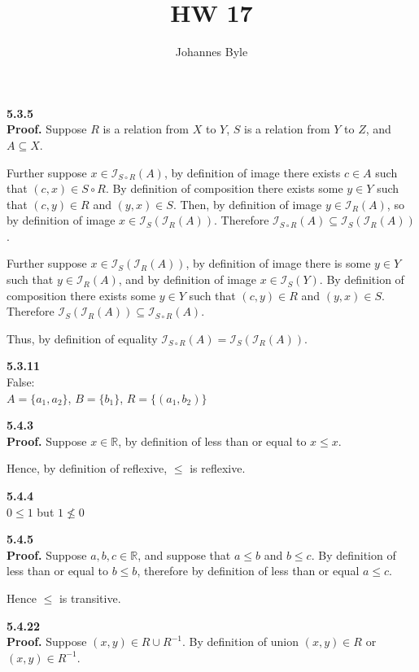 \documentclass[12pt]{article}
\title{HW 17}
\author{Johannes Byle}
\newcommand{\image}[2]{\mathcal{I}_{#1}(#2)}
\begin{document}
    \maketitle
    \noindent
    \textbf{5.3.5}\\
    \textbf{Proof.} Suppose $R$ is a relation from $X$ to $Y$, $S$ is a relation from $Y$ to $Z$, and $A\subseteq X$.

    Further suppose $x\in\image{S\circ R}{A}$, by definition of image there exists $c\in A$ such that $(c, x)\in
    S\circ R$.
    By definition of composition there exists some $y\in Y$ such that $(c, y)\in R$ and $(y, x)\in S$.
    Then, by definition of image $y\in\image{R}{A}$, so by definition of image $x\in\image{S}{\image{R}{A}}$.
    Therefore $\image{S\circ R}{A}\subseteq\image{S}{\image{R}{A}}$.

    Further suppose $x\in\image{S}{\image{R}{A}}$, by definition of image there is some $y\in Y$ such
    that $y\in\image{R}{A}$, and by definition of image $x\in\image{S}{Y}$.
    By definition of composition there exists some $y\in Y$ such that $(c, y)\in R$ and $(y, x)\in S$.
    Therefore $\image{S}{\image{R}{A}}\subseteq\image{S\circ R}{A}$.

    Thus, by definition of equality $\image{S\circ R}{A}=\image{S}{\image{R}{A}}$.


    \medskip
    \noindent
    \textbf{5.3.11}\\
    False:\\
    $A=\{a_1, a_2\}$, $B=\{b_1\}$, $R=\{(a_1, b_2)\}$

    \medskip
    \noindent
    \textbf{5.4.3}\\
    \textbf{Proof.} Suppose $x\in\mathbb{R}$, by definition of less than or equal to $x\leq x$.

    Hence, by definition of reflexive, $\leq$ is reflexive.

    \medskip
    \noindent
    \textbf{5.4.4}\\
    $0\leq 1$ but $1\nleq 0$

    \medskip
    \noindent
    \textbf{5.4.5}\\
    \textbf{Proof.} Suppose $a, b, c\in\mathbb{R}$, and suppose that $a\leq b$ and $b\leq c$.
    By definition of less than or equal to $b\leq b$, therefore by definition of less than or equal $a\leq c$.

    Hence $\leq$ is transitive.

    \medskip
    \noindent
    \textbf{5.4.22}\\
    \textbf{Proof.} Suppose $(x, y)\in R\cup R^{-1}$.
    By definition of union $(x, y)\in R$ or $(x, y)\in R^{-1}$.
\end{document}
